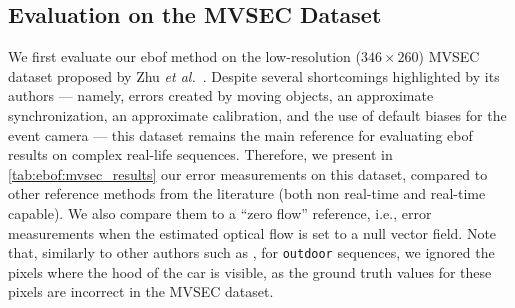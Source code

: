 \subsection{Evaluation on the MVSEC Dataset}\label{sec:ebof:eval_mvsec}
We first evaluate our \acrshort{ebof} method on the low-resolution (\(346\times260\)) MVSEC dataset proposed by Zhu \textit{et al.}~\cite{Zhu2018EVFlowNetSO,Zhu2018TheMS}. Despite several shortcomings highlighted by its authors --- namely, errors created by moving objects, an approximate synchronization, an approximate calibration, and the use of default biases for the event camera --- this dataset remains the main reference for evaluating \acrshort{ebof} results on complex real-life sequences. Therefore, we present in \cref{tab:ebof:mvsec_results} our error measurements on this dataset, compared to other reference methods from the literature (both non real-time and real-time capable). We also compare them to a ``zero flow'' reference, i.e., error measurements when the estimated optical flow is set to a null vector field. Note that, similarly to other authors such as \cite{Zhu2018EVFlowNetSO, Stoffregen2020ReducingTS}, for \verb|outdoor| sequences, we ignored the pixels where the hood of the car is visible, as the ground truth values for these pixels are incorrect in the MVSEC dataset.

